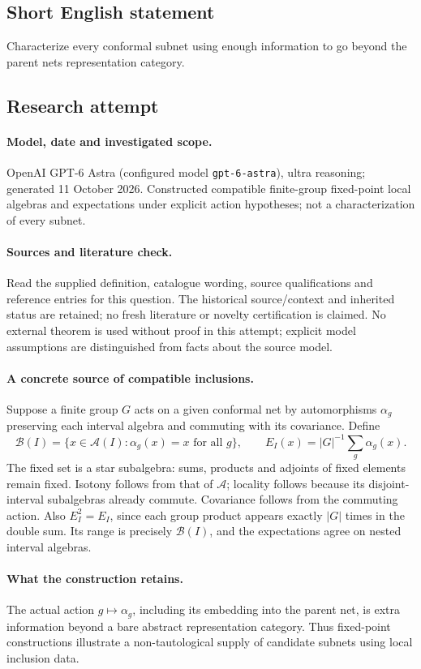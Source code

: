 \documentclass[11pt]{article}
\begin{document}
\subsection{Short English statement}
Characterize every conformal subnet using enough information to go beyond the parent net\textquotesingle s representation category.
\subsection{Research attempt}
\paragraph{Model, date and investigated scope.}
OpenAI GPT-6 Astra (configured model \texttt{gpt-6-astra}), ultra reasoning; generated 11 October 2026. Constructed compatible finite-group fixed-point local algebras and expectations under explicit action hypotheses; not a characterization of every subnet.

\paragraph{Sources and literature check.}
Read the supplied definition, catalogue wording, source qualifications and reference entries for this question. The historical source/context and inherited status are retained; no fresh literature or novelty certification is claimed. No external theorem is used without proof in this attempt; explicit model assumptions are distinguished from facts about the source model.

\paragraph{A concrete source of compatible inclusions.} Suppose a finite group \(G\) acts on a given conformal net by automorphisms \(\alpha_g\) preserving each interval algebra and commuting with its covariance. Define
\[
 \mathcal B(I)=\{x\in\mathcal A(I):\alpha_g(x)=x\text{ for all }g\},\qquad
 E_I(x)=|G|^{-1}\sum_g\alpha_g(x).
\]
The fixed set is a star subalgebra: sums, products and adjoints of fixed elements remain fixed. Isotony follows from that of \(\mathcal A\); locality follows because its disjoint-interval subalgebras already commute. Covariance follows from the commuting action. Also \(E_I^2=E_I\), since each group product appears exactly \(|G|\) times in the double sum. Its range is precisely \(\mathcal B(I)\), and the expectations agree on nested interval algebras.
\paragraph{What the construction retains.} The actual action \(g\mapsto\alpha_g\), including its embedding into the parent net, is extra information beyond a bare abstract representation category. Thus fixed-point constructions illustrate a non-tautological supply of candidate subnets using local inclusion data.
\end{document}

